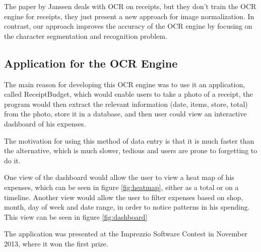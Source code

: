 The paper by Janssen\cite{janssen2012receipts2go} deals with OCR on receipts, but they don't train the OCR engine for receipts, they just present a new approach for image normalization. In contrast, our approach improves the accuracy of the OCR engine by focusing on the character segmentation and recognition problem. 

\subsection{Application for the OCR Engine}
The main reason for developing this OCR engine was to use it an application, called ReceiptBudget, which would enable users to take a photo of a receipt, the program would then extract the relevant information (date, items, store, total) from the photo, store it in a database, and then user could view an interactive dashboard of his expenses.

The motivation for using this method of data entry is that it is much faster than the alternative, which is much slower, tedious and users are prone to forgetting to do it. 

One view of the dashboard would allow the user to view a heat map of his expenses, which can be seen in figure \ref{fig:heatmap}, either as a total or on a timeline. Another view would allow the user to filter expenses based on shop, month, day of week and date range, in order to notice patterns in his spending. This view can be seen in figure \ref{fig:dashboard}

The application was presented at the Imprezzio Software Contest in November 2013, where it won the first prize\cite{WinNT}.
